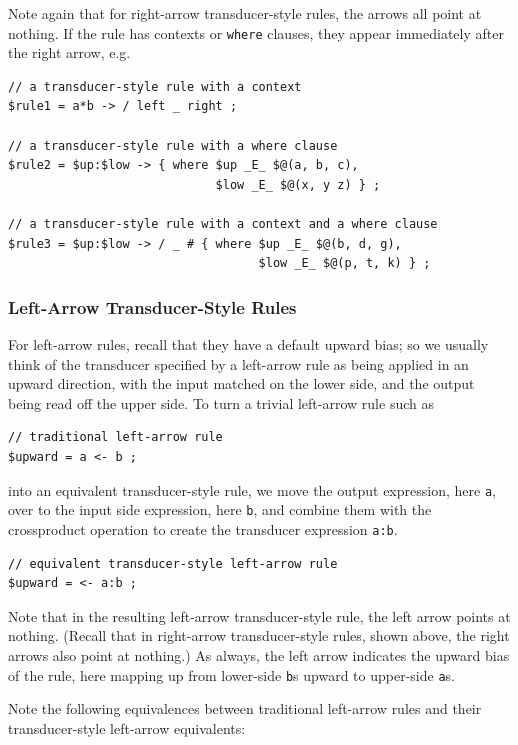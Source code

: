 Note again that for right-arrow transducer-style rules, the arrows all point at nothing.  If the rule
has contexts or \texttt{where} clauses, they appear immediately after the right arrow, e.g.

\begin{Verbatim}
// a transducer-style rule with a context
$rule1 = a*b -> / left _ right ;

// a transducer-style rule with a where clause
$rule2 = $up:$low -> { where $up _E_ $@(a, b, c),
                             $low _E_ $@(x, y z) } ;

// a transducer-style rule with a context and a where clause
$rule3 = $up:$low -> / _ # { where $up _E_ $@(b, d, g),
                                   $low _E_ $@(p, t, k) } ;
\end{Verbatim}

\subsubsection{Left-Arrow Transducer-Style Rules}

For left-arrow rules, recall that they have a default upward bias; so we usually think of the transducer
specified by a left-arrow rule as being applied in an upward direction, with the input matched on the
lower side, and the output being read off the upper side.  To turn a trivial left-arrow rule such as

\begin{Verbatim}
// traditional left-arrow rule
$upward = a <- b ;
\end{Verbatim}

\noindent
into an equivalent transducer-style rule, we move the output expression, here \verb!a!, over to the
input side expression, here \verb!b!, and combine them with the crossproduct operation to create the
transducer expression \verb!a:b!.  

\begin{Verbatim}
// equivalent transducer-style left-arrow rule
$upward = <- a:b ;
\end{Verbatim}

\noindent
Note that in the resulting left-arrow transducer-style rule, the left arrow points at nothing.
(Recall that in right-arrow transducer-style rules, shown above, the right arrows also point at nothing.)  As
always, the left arrow indicates the upward bias of the rule, here mapping up from lower-side \verb!b!s upward to
upper-side \verb!a!s.

Note the following equivalences between traditional left-arrow rules and their
transducer-style left-arrow equivalents:

